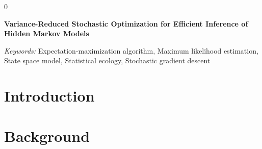 \documentclass[12pt]{article}
\newcommand{\blind}{0}
\begin{document}
\blind
{
  \bigskip
  \bigskip
  \bigskip
  \begin{center}
    {\LARGE\bf Variance-Reduced Stochastic Optimization for Efficient Inference of Hidden Markov Models}
  \end{center}
  \medskip
} \fi

\bigskip
\begin{abstract}
    Hidden Markov models (HMMs) are popular models to identify a finite number of latent states from sequential data. However, fitting them to large data sets can be computationally demanding because most likelihood maximization techniques require iterating through the entire underlying data set for every parameter update. 
    We propose a novel optimization algorithm that updates the parameters of an HMM without iterating through the entire data set. Namely, we combine a partial E step with variance-reduced stochastic optimization within the M step. We prove the algorithm converges under certain regularity conditions. We test our algorithm empirically using a simulation study as well as a case study of kinematic data collected using suction-cup attached biologgers from eight northern resident killer whales ({\em{Orcinus orca}}) off the western coast of Canada. In both, our algorithm converges in fewer epochs and to regions of higher likelihood compared to standard numerical optimization techniques. Our algorithm allows practitioners to fit complicated HMMs to large time-series data sets more efficiently than existing baselines.
\end{abstract}

\noindent%
{\it Keywords:} Expectation-maximization algorithm, Maximum likelihood estimation, State space model, Statistical ecology, Stochastic gradient descent%
\vfill 

\newpage
{} %

\section{Introduction}


\section{Background}

\end{document}
